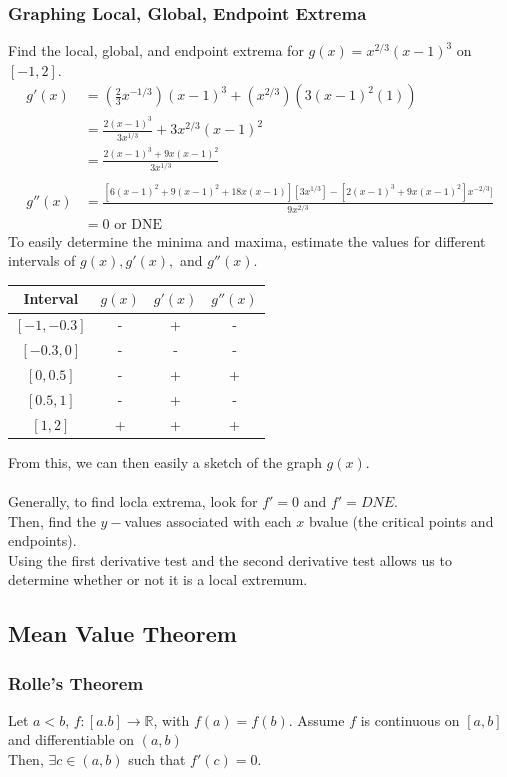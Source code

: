 \documentclass{article}
\begin{document}
\subsubsection{Graphing Local, Global, Endpoint Extrema}
Find the local, global, and endpoint extrema for $g(x) = x^{2/3} (x-1)^3$ on $[-1, 2]$.\\
\begin{align*}
    g'(x) & = (\frac{2}{3}x^{-1/3}) (x-1)^3 + (x^{2/3}) (3(x-1)^2(1))\\
    & = \frac{2(x-1)^3}{3 x^{1/3}} + 3x^{2/3}(x-1)^2\\
    & = \frac{2(x-1)^3 + 9x(x - 1)^2}{3x^{1/3}}\\
    \\
    g''(x) & = \frac{[6(x-1)^2 + 9(x - 1)^2 + 18x(x-1)] [3x^{1/3}] - [2(x-1)^3 + 9x (x-1)^2]x^{-2/3}]}{9x^{2/3}}\\
    & = 0 \text{ or DNE}
\end{align*}
To easily determine the minima and maxima, estimate the values for different intervals of $g(x), g'(x),$ and $g''(x)$.
\begin{center}
\begin{tabular}{ c|c|c|c } 
 Interval & $g(x)$ & $g'(x)$ & $g''(x)$\\
 \hline
 $[-1, -0.3]$ & - & + & - \\ 
 $[-0.3, 0]$ & - & - & - \\
 $[0, 0.5]$ & - & + & + \\
 $[0.5, 1]$ & - & + & - \\
 $[1, 2]$ & +  & + & +
\end{tabular}
\end{center}
From this, we can then easily a sketch of the graph $g(x)$.\\
\\
Generally, to find locla extrema, look for $f' = 0$ and $f' = DNE$.\\
Then, find the $y-$values associated with each $x$ bvalue (the critical points and endpoints).\\
Using the first derivative test and the second derivative test allows us to determine whether or not it is a local extremum.

\subsection{Mean Value Theorem}
\subsubsection{Rolle's Theorem}
Let $a < b$, $f: [a. b] \to \mathbb{R}$, with $f(a) = f(b)$. Assume $f$ is continuous on $[a,b]$ and differentiable on $(a,b)$\\
Then, $\exists c \in (a, b)$ such that $f'(c) = 0$.
\end{document}

